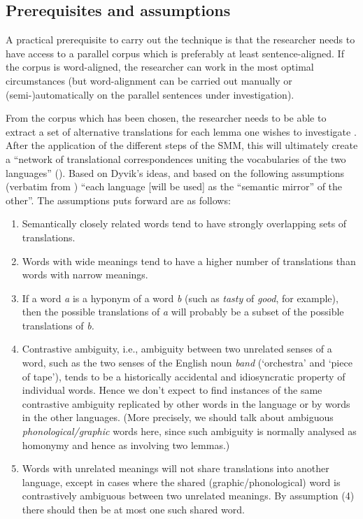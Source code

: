 \subsection{Prerequisites and assumptions}
\label{sec:3.4.2}
A practical prerequisite to carry out the technique is that the researcher needs to have access to a parallel corpus which is preferably at least sentence-aligned. If the corpus is word-aligned, the researcher can work in the most optimal circumstances (but word-alignment can be carried out manually or (semi-)automatically on the parallel sentences under investigation).

From the corpus which has been chosen, the researcher needs to be able to extract a set of alternative translations for each lemma one wishes to investigate \citep[31]{langemets_translations_2005}. After the application of the different steps of the SMM, this will ultimately create a “network of translational correspondences uniting the vocabularies of the two languages” (\citeyear[31]{langemets_translations_2005}). Based on Dyvik’s ideas, and based on the following assumptions (verbatim from \citealt[31--32]{langemets_translations_2005}) “each language [will be used] as the ``semantic mirror'' of the other”. The assumptions \citet[31--32]{langemets_translations_2005} puts forward are as follows:

\begin{enumerate}
\item
Semantically closely related words tend to have strongly overlapping sets of translations.
\item
Words with wide meanings tend to have a higher number of translations than words with narrow meanings.
\item
If a word \textit{a} is a hyponym of a word \textit{b} (such as \textit{tasty} of \textit{good}, for example), then the possible translations of \textit{a} will probably be a subset of the possible translations of \textit{b.}
\item
Contrastive ambiguity, i.e., ambiguity between two unrelated senses of a word, such as the two senses of the English noun \textit{band} (‘orchestra’ and ‘piece of tape’), tends to be a historically accidental and idiosyncratic property of individual words. Hence we don’t expect to find instances of the same contrastive ambiguity replicated by other words in the language or by words in the other languages. (More precisely, we should talk about ambiguous \textit{phonological/graphic} words here, since such ambiguity is normally analysed as homonymy and hence as involving two lemmas.)
\item
Words with unrelated meanings will not share translations into another language, except in cases where the shared (graphic\slash phonological) word is contrastively ambiguous between two unrelated meanings. By assumption (4) there should then be at most one such shared word.
\end{enumerate}


